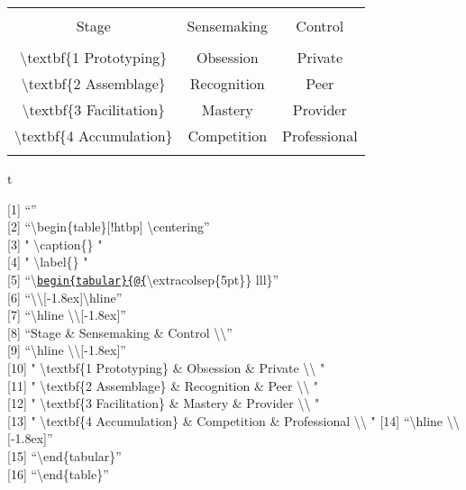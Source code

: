 \documentclass[]{article}
\newenvironment{Shaded}{\begin{snugshade}}{\end{snugshade}}
\newcommand{\NormalTok}[1]{{#1}}
\begin{document}
\begin{table}[!htbp] \centering 
  \caption{} 
  \label{} 
\begin{tabular}{@{\extracolsep{5pt}} ccc} 
\\[-1.8ex]\hline 
\hline \\[-1.8ex] 
Stage & Sensemaking & Control \\ 
\hline \\[-1.8ex] 
 \textbackslash textbf\{1 Prototyping\} & Obsession & Private \\ 
 \textbackslash textbf\{2 Assemblage\} & Recognition & Peer \\ 
 \textbackslash textbf\{3 Facilitation\} & Mastery & Provider \\ 
 \textbackslash textbf\{4 Accumulation\} & Competition & Professional \\ 
\hline \\[-1.8ex] 
\end{tabular} 
\end{table}

\begin{Shaded}
\begin{Highlighting}[]
\NormalTok{t}
\end{Highlighting}
\end{Shaded}

{[}1{]} ``''\\
 {[}2{]} ``\textbackslash{}begin\{table\}{[}!htbp{]}
\textbackslash{}centering''\\
 {[}3{]} " \textbackslash{}caption\{\} "\\
 {[}4{]} " \textbackslash{}label\{\} "\\
 {[}5{]}
``\textbackslash{}\href{mailto:begin\%7Btabular\%7D\%7B@\%7B}{\nolinkurl{begin\{tabular\}\{@\{}}\textbackslash{}extracolsep\{5pt\}\}
lll\}''\\
 {[}6{]}
``\textbackslash{}\textbackslash{}{[}-1.8ex{]}\textbackslash{}hline''\\
 {[}7{]} ``\textbackslash{}hline
\textbackslash{}\textbackslash{}{[}-1.8ex{]}''\\
 {[}8{]} ``Stage \& Sensemaking \& Control
\textbackslash{}\textbackslash{}''\\
 {[}9{]} ``\textbackslash{}hline
\textbackslash{}\textbackslash{}{[}-1.8ex{]}''\\
{[}10{]} " \textbackslash{}textbf\{1 Prototyping\} \& Obsession \&
Private \textbackslash{}\textbackslash{} "\\
{[}11{]} " \textbackslash{}textbf\{2 Assemblage\} \& Recognition \& Peer
\textbackslash{}\textbackslash{} "\\
{[}12{]} " \textbackslash{}textbf\{3 Facilitation\} \& Mastery \&
Provider \textbackslash{}\textbackslash{} "\\
{[}13{]} " \textbackslash{}textbf\{4 Accumulation\} \& Competition \&
Professional \textbackslash{}\textbackslash{} " {[}14{]}
``\textbackslash{}hline \textbackslash{}\textbackslash{}{[}-1.8ex{]}''\\
{[}15{]} ``\textbackslash{}end\{tabular\}''\\
{[}16{]} ``\textbackslash{}end\{table\}''
\end{document}
